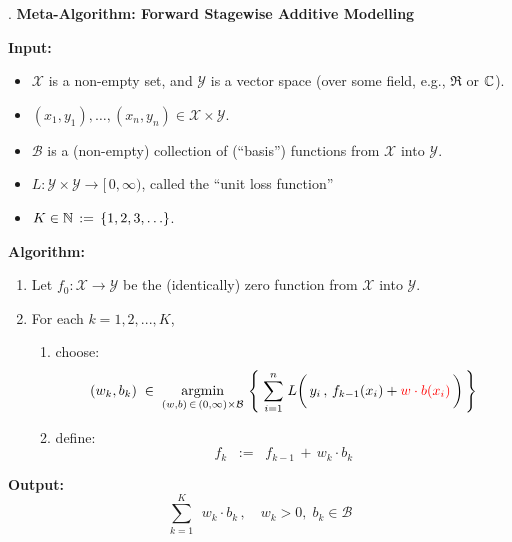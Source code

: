 \begin{center}
\begin{minipage}{6in}
\begin{tcolorbox}[width=0.95\linewidth,colback=white,colframe=gray]
	\begin{center}
	{\color{white}.}\vskip 0.1cm
	\textbf{\large Meta-Algorithm: Forward Stagewise Additive Modelling}
	\end{center}
	\textbf{Input:}
	\begin{itemize}
	\item
		$\mathcal{X}$ is a non-empty set, and $\mathcal{Y}$ is a vector space (over some field, e.g., $\Re$ or $\mathbb{C}$).
	\item
		$(x_{1},y_{1}), \ldots, (x_{n},y_{n}) \in \mathcal{X} \times \mathcal{Y}$.
	\item
		$\mathcal{B}$ is a (non-empty) collection of (``basis'') functions from $\mathcal{X}$ into $\mathcal{Y}$.
	\item
		$L : \mathcal{Y} \times \mathcal{Y} \longrightarrow [\,0,\infty)$, called the ``unit loss function''
	\item
		$K \in \mathbb{N} \,:=\, \{1,2,3,\ldots\}$.
	\end{itemize}
	\vskip 0.3cm
	\textbf{Algorithm:}
	\begin{enumerate}
	\item
		Let $f_{0} : \mathcal{X} \longrightarrow \mathcal{Y}$ be the (identically) zero function from $\mathcal{X}$ into $\mathcal{Y}$.
	\item
		For each $k = 1, 2, ... , K$, 
		\begin{enumerate}
		\item
			choose:
			\begin{equation*}
			(w_{k},b_{k})
			\;\in\;
				\underset{(w,b)\,\in\,(0,\infty)\times\mathcal{B}}{\argmin}\,
				\left\{\;
					\overset{n}{\underset{i=1}{\sum}}\;
					L\!\left(\,y_{i}\,,\,f_{k-1}(x_{i}) \overset{{\color{white}1}}{+} {\color{red}w \cdot b(x_{i})}\,\right)
					\,\right\}
			\end{equation*}
		\item
			define:
			\begin{equation*}
			f_{k} \;\; := \;\; f_{k-1} \,+\, w_{k} \cdot b_{k}
			\end{equation*}
		\end{enumerate}
	\end{enumerate}
	\textbf{Output:}
	\begin{equation*}
	\overset{K}{\underset{k = 1}{\sum}}\;\,w_{k} \cdot b_{k}\,,
	\quad
	w_{k} > 0,\; b_{k} \in \mathcal{B} 
	\end{equation*}
\end{tcolorbox}
\end{minipage}
\end{center}

\renewcommand{\theenumi}{\roman{enumi}}
\renewcommand{\labelenumi}{\textnormal{(\theenumi)}$\;\;$}

